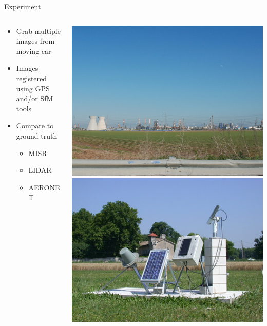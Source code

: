 \documentclass[compress,red,12pt]{beamer}
\begin{document}
\begin{frame}[label=current]{Experiment}
  \begin{columns}[T]
    \begin{column}{.7\textwidth}
      \begin{itemize}
      \item Grab multiple images from moving car
      \item Images registered using GPS and/or SfM tools
      \item Compare to ground truth
        \begin{itemize}
        \item MISR
        \item LIDAR
        \item AERONET
        \end{itemize}
      \end{itemize}
    \end{column}
    \begin{column}{.3\textwidth}
      \centering
      \includegraphics[height=0.30\textheight]{DSC_0688.JPG}
      \includegraphics[height=0.30\textheight]{AERONET.jpg}
    \end{column}
  \end{columns}
\end{frame}
\end{document}
